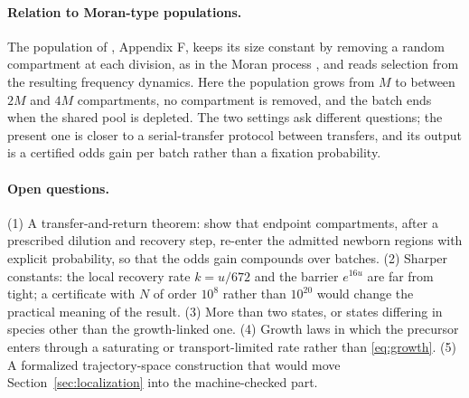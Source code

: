\documentclass[11pt,a4paper]{article}
\theoremstyle{plain}
\theoremstyle{definition}
\theoremstyle{remark}
\begin{document}
\paragraph{Relation to Moran-type populations.}
The population of \citet{matsubara2026}, Appendix F, keeps its size constant by removing a random compartment at each division, as in the Moran process \citep{moran1958}, and reads selection from the resulting frequency dynamics. Here the population grows from $M$ to between $2M$ and $4M$ compartments, no compartment is removed, and the batch ends when the shared pool is depleted. The two settings ask different questions; the present one is closer to a serial-transfer protocol between transfers, and its output is a certified odds gain per batch rather than a fixation probability.

\paragraph{Open questions.}
(1) A transfer-and-return theorem: show that endpoint compartments, after a prescribed dilution and recovery step, re-enter the admitted newborn regions with explicit probability, so that the odds gain compounds over batches. (2) Sharper constants: the local recovery rate $k=u/672$ and the barrier $e^{16u}$ are far from tight; a certificate with $N$ of order $10^{8}$ rather than $10^{20}$ would change the practical meaning of the result. (3) More than two states, or states differing in species other than the growth-linked one. (4) Growth laws in which the precursor enters through a saturating or transport-limited rate rather than \eqref{eq:growth}. (5) A formalized trajectory-space construction that would move Section~\ref{sec:localization} into the machine-checked part.

\appendix
\end{document}
